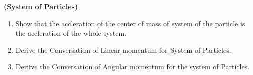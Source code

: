\documentclass{article}[12pt, a4paper]
\begin{document}
\centering \textbf{(System of Particles)}
\begin{enumerate}
\item Show that the accleration of the center of mass of system of the particle is the
accleration of the whole system.
\item Derive the Conversation of Linear momentum for System of Particles.
\item Derifve the Conversation of Angular momentum for the system of Particles.

\end{enumerate}
\end{document}
